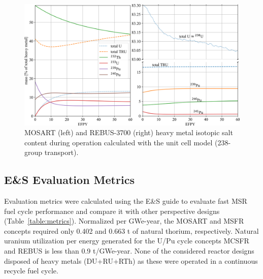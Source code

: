 \documentclass[letterpaper]{mandc2019}
\begin{document}
\begin{figure}[t!]
  \centering
  \includegraphics[width=\textwidth]{./Figures/mosart_rebus_balance.png}
  	  \vspace{-0.2in}
  \caption{\gls{MOSART} (left) and REBUS-3700 (right) heavy metal isotopic salt content during operation calculated with the unit cell model (238-group transport).}
  \label{fig:mosart-balance}
\end{figure}
\subsection{E\&S Evaluation Metrics}
\label{sec:metrics}
Evaluation metrics were calculated using the E\&S guide \cite{wigeland_nuclear_2014-4} to evaluate fast \gls{MSR} fuel cycle performance and compare it with other perspective designs (Table~\ref{table:metrics}). 
Normalized per GWe-year, the \gls{MOSART} and \gls{MSFR} concepts required only 0.402 and 0.663 t of natural thorium, respectively. 
Natural uranium utilization per energy generated for the U/Pu cycle concepts \gls{MCSFR} and REBUS is less than 0.9 t/GWe-year. 
None of the considered reactor designs disposed of heavy metals (\gls{DU}+\gls{RU}+\gls{RTh}) as these were operated in a continuous recycle fuel cycle.
\end{document}
